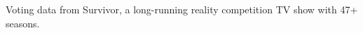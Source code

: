 \documentclass[preview]{standalone}
\begin{document}
Voting data from Survivor, a long-running reality competition TV show with 47+ seasons.\\
\end{document}
